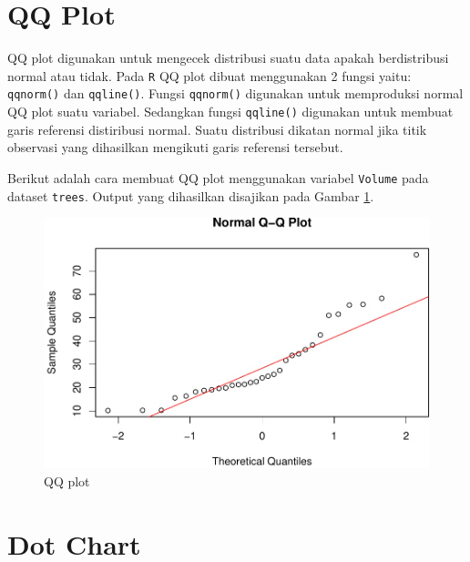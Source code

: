 \documentclass[]{book}
\newenvironment{Shaded}{\begin{snugshade}}{\end{snugshade}}
\newcommand{\KeywordTok}[1]{\textcolor[rgb]{0.13,0.29,0.53}{\textbf{#1}}}
\newcommand{\DataTypeTok}[1]{\textcolor[rgb]{0.13,0.29,0.53}{#1}}
\newcommand{\StringTok}[1]{\textcolor[rgb]{0.31,0.60,0.02}{#1}}
\newcommand{\OperatorTok}[1]{\textcolor[rgb]{0.81,0.36,0.00}{\textbf{#1}}}
\newcommand{\NormalTok}[1]{#1}
\begin{document}
\section{QQ Plot}\label{qq-plot}

QQ plot digunakan untuk mengecek distribusi suatu data apakah
berdistribusi normal atau tidak. Pada \texttt{R} QQ plot dibuat
menggunakan 2 fungsi yaitu: \texttt{qqnorm()} dan \texttt{qqline()}.
Fungsi \texttt{qqnorm()} digunakan untuk memproduksi normal QQ plot
suatu variabel. Sedangkan fungsi \texttt{qqline()} digunakan untuk
membuat garis referensi distiribusi normal. Suatu distribusi dikatan
normal jika titik observasi yang dihasilkan mengikuti garis referensi
tersebut.

Berikut adalah cara membuat QQ plot menggunakan variabel \texttt{Volume}
pada dataset \texttt{trees}. Output yang dihasilkan disajikan pada
Gambar \ref{fig:qq}.

\begin{Shaded}
\end{Shaded}

\begin{figure}

{\centering \includegraphics[width=0.7\linewidth]{EnvStat_files/figure-latex/qq-1} 

}

\caption{QQ plot}\label{fig:qq}
\end{figure}

\section{Dot Chart}\label{dot-chart}
\end{document}
